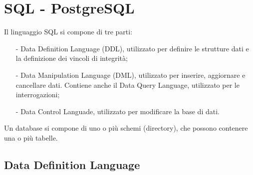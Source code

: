 \documentclass[a4paper, 10pt]{report}
\begin{document}
\chapter{SQL - PostgreSQL}

\noindent Il linguaggio SQL si compone di tre parti:

\begin{itemize}
\item[-] Data Definition Language (DDL), utilizzato per definire le strutture dati e la definizione dei vincoli di integrità;
\item[-] Data Manipulation Language (DML), utilizzato per inserire, aggiornare e cancellare dati. Contiene anche il Data Query Language, utilizzato per le interrogazioni;
\item[-] Data Control Languade, utilizzato per modificare la base di dati.
\end{itemize}

\noindent Un database si compone di uno o più schemi (directory), che possono contenere una o più tabelle.

\section{Data Definition Language}
\end{document}
